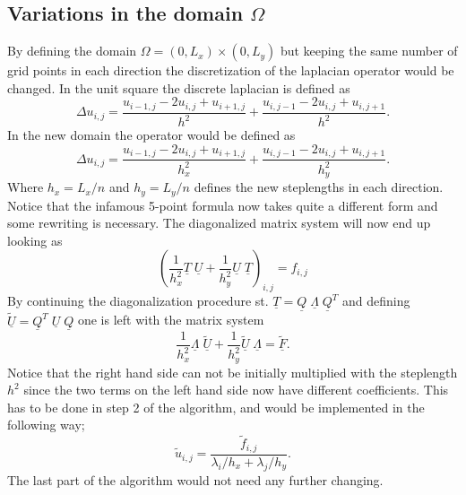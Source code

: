 \subsection{Variations in the domain $\Omega$}
By defining the domain $\Omega = (0,L_x)\times(0,L_y)$ but keeping the same number of grid points in each direction 
the discretization of the laplacian operator would be changed. In the unit square the discrete laplacian is defined as 
\begin{equation}
	\Delta u_{i,j} = \frac{u_{i-1,j}-2u_{i,j}+u_{i+1,j}}{h^2}+\frac{u_{i,j-1}-2u_{i,j}+u_{i,j+1}}{h^2}.
\end{equation}
In the new domain the operator would be defined as  
\begin{equation}
	\Delta u_{i,j} = \frac{u_{i-1,j}-2u_{i,j}+u_{i+1,j}}{h_x^2}+\frac{u_{i,j-1}-2u_{i,j}+u_{i,j+1}}{h_y^2}.
\end{equation}
Where $h_x=L_x/n$ and $h_y=L_y/n$ defines the new steplengths in each direction. Notice that the infamous 5-point formula now takes quite a 
different form and some rewriting is necessary. 
The diagonalized matrix system will now end up looking as 
\begin{equation}
	\left( \frac{1}{h_x^2}\underline{T} \; \underline{U}+\frac{1}{h_y^2}\underline{U}\; \underline{T} \right) _{i,j}=f_{i,j}
\end{equation}
By continuing the diagonalization procedure st. $\underline{T}=\underline{Q}\;\underline{\Lambda}\;\underline{Q}^T $
and defining $\underline{\tilde{U}}= \underline{Q}^T\;\underline{U}\;\underline{Q}$ one is left with the matrix system 
\begin{equation}
	\frac{1}{h_x^2}\underline{\Lambda} \; \underline{\tilde{U}}+\frac{1}{h_y^2}\underline{\tilde{U}}\; \underline{\Lambda} =\underline{\tilde{F}}.
\end{equation}
Notice that the right hand side can not be initially multiplied with the steplength $h^2$ since the two terms on the left hand side
now have different coefficients. This has to be done in step 2 of the algorithm, and would be implemented in the following way; 
\begin{equation}
	\tilde{u}_{i,j} = \frac{\tilde{f}_{i,j}}{\lambda_i/h_x+\lambda_j/h_y}.
\end{equation}
The last part of the algorithm would not need any further changing.

